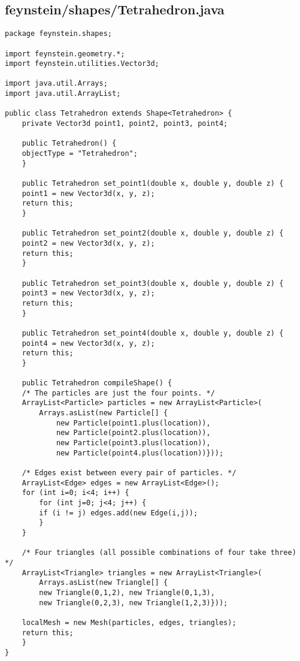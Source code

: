 \subsection*{feynstein/shapes/Tetrahedron.java}
\begin{lstlisting}
package feynstein.shapes;

import feynstein.geometry.*;
import feynstein.utilities.Vector3d;

import java.util.Arrays;
import java.util.ArrayList;

public class Tetrahedron extends Shape<Tetrahedron> {
    private Vector3d point1, point2, point3, point4;

    public Tetrahedron() {
	objectType = "Tetrahedron";
    }

    public Tetrahedron set_point1(double x, double y, double z) {
	point1 = new Vector3d(x, y, z);
	return this;
    }

    public Tetrahedron set_point2(double x, double y, double z) {
	point2 = new Vector3d(x, y, z);
	return this;
    }

    public Tetrahedron set_point3(double x, double y, double z) {
	point3 = new Vector3d(x, y, z);
	return this;
    }

    public Tetrahedron set_point4(double x, double y, double z) {
	point4 = new Vector3d(x, y, z);
	return this;
    }

    public Tetrahedron compileShape() {
	/* The particles are just the four points. */
	ArrayList<Particle> particles = new ArrayList<Particle>(
	    Arrays.asList(new Particle[] {
		    new Particle(point1.plus(location)), 
		    new Particle(point2.plus(location)), 
		    new Particle(point3.plus(location)), 
		    new Particle(point4.plus(location))}));

	/* Edges exist between every pair of particles. */
	ArrayList<Edge> edges = new ArrayList<Edge>();
	for (int i=0; i<4; i++) {
	    for (int j=0; j<4; j++) {
		if (i != j) edges.add(new Edge(i,j));
	    }
	}

	/* Four triangles (all possible combinations of four take three) */
	ArrayList<Triangle> triangles = new ArrayList<Triangle>(
	    Arrays.asList(new Triangle[] {
		new Triangle(0,1,2), new Triangle(0,1,3),
		new Triangle(0,2,3), new Triangle(1,2,3)}));

	localMesh = new Mesh(particles, edges, triangles);
	return this;
    }
}\end{lstlisting}

